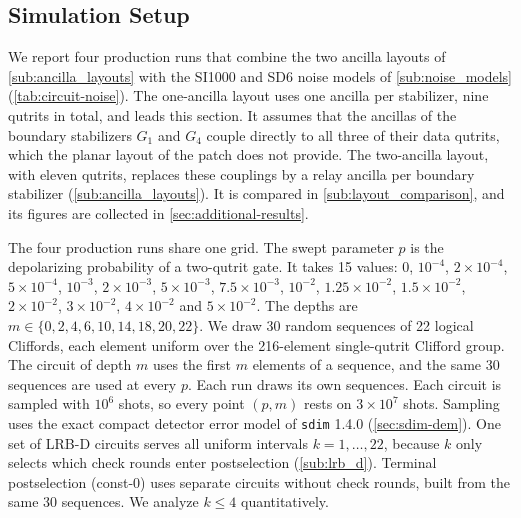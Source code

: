 
\subsection{Simulation Setup}
\label{sub:results_setup}

We report four production runs that combine the two ancilla layouts of \autoref{sub:ancilla_layouts} with the SI1000 and SD6 noise models of \autoref{sub:noise_models} (\autoref{tab:circuit-noise}). The one-ancilla layout uses one ancilla per stabilizer, nine qutrits in total, and leads this section.
It assumes that the ancillas of the boundary stabilizers $G_1$ and $G_4$ couple directly to all three of their data qutrits, which the planar layout of the patch does not provide. The two-ancilla layout, with eleven qutrits, replaces these couplings by a relay ancilla per boundary stabilizer (\autoref{sub:ancilla_layouts}). It is compared in \autoref{sub:layout_comparison}, and its figures are collected in \autoref{sec:additional-results}.

The four production runs share one grid. The swept parameter $p$ is the depolarizing probability of a two-qutrit gate. It takes 15 values: $0$, $10^{-4}$, $2\times10^{-4}$, $5\times10^{-4}$, $10^{-3}$, $2\times10^{-3}$, $5\times10^{-3}$, $7.5\times10^{-3}$, $10^{-2}$, $1.25\times10^{-2}$, $1.5\times10^{-2}$, $2\times10^{-2}$, $3\times10^{-2}$, $4\times10^{-2}$ and $5\times10^{-2}$. The depths are $m \in \{0, 2, 4, 6, 10, 14, 18, 20, 22\}$. We draw 30 random sequences of 22 logical Cliffords, each element uniform over the 216-element single-qutrit Clifford group. The circuit of depth $m$ uses the first $m$ elements of a sequence, and the same 30 sequences are used at every $p$. Each run draws its own sequences. Each circuit is sampled with $10^6$ shots, so every point $(p, m)$ rests on $3\times10^7$ shots. Sampling uses the exact compact detector error model of \texttt{sdim} 1.4.0 (\autoref{sec:sdim-dem}). One set of LRB-D circuits serves all uniform intervals $k = 1, \dots, 22$, because $k$ only selects which check rounds enter postselection (\autoref{sub:lrb_d}). Terminal postselection (const-0) uses separate circuits without check rounds, built from the same 30 sequences. We analyze $k \le 4$ quantitatively.

